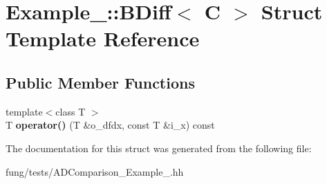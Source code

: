\hypertarget{structExample__1_1_1BDiff}{\section{Example\-\_\-:\-:B\-Diff$<$ C $>$ Struct Template Reference}
\label{structExample__1_1_1BDiff}
}
\subsection*{Public Member Functions}
\begin{DoxyCompactItemize}
\item 
\hypertarget{structExample__1_1_1BDiff_a7c9e2208f422f1efaa97d3702bd8e36a}{{\footnotesize template$<$class T $>$ }\\T {\bfseries operator()} (T \&o\-\_\-dfdx, const T \&i\-\_\-x) const }\label{structExample__1_1_1BDiff_a7c9e2208f422f1efaa97d3702bd8e36a}

\end{DoxyCompactItemize}


The documentation for this struct was generated from the following file\-:\begin{DoxyCompactItemize}
\item 
fung/tests/A\-D\-Comparison\-\_\-\-Example\-\_.\-hh\end{DoxyCompactItemize}

